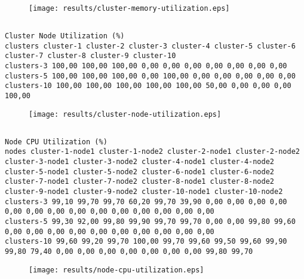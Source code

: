 \documentclass{elsart}
\begin{document}
\begin{figure}[ht]
\centering
\texttt{[image: results/cluster-memory-utilization.eps]}
\caption{}\label{fig:cluster-memory-utilization.eps}
\end{figure}

\subsection{}

\begin{lstlisting}[caption={}]
Cluster Node Utilization (%)
clusters cluster-1 cluster-2 cluster-3 cluster-4 cluster-5 cluster-6 cluster-7 cluster-8 cluster-9 cluster-10
clusters-3 100,00 100,00 100,00 0,00 0,00 0,00 0,00 0,00 0,00 0,00
clusters-5 100,00 100,00 100,00 0,00 100,00 0,00 0,00 0,00 0,00 0,00
clusters-10 100,00 100,00 100,00 100,00 100,00 50,00 0,00 0,00 0,00 100,00
\end{lstlisting}

\begin{figure}[ht]
\centering
\texttt{[image: results/cluster-node-utilization.eps]}
\caption{}\label{fig:cluster-node-utilization.eps}
\end{figure}

\subsection{}

\begin{lstlisting}[caption={}]
Node CPU Utilization (%)
nodes cluster-1-node1 cluster-1-node2 cluster-2-node1 cluster-2-node2 cluster-3-node1 cluster-3-node2 cluster-4-node1 cluster-4-node2 cluster-5-node1 cluster-5-node2 cluster-6-node1 cluster-6-node2 cluster-7-node1 cluster-7-node2 cluster-8-node1 cluster-8-node2 cluster-9-node1 cluster-9-node2 cluster-10-node1 cluster-10-node2
clusters-3 99,10 99,70 99,70 60,20 99,70 39,90 0,00 0,00 0,00 0,00 0,00 0,00 0,00 0,00 0,00 0,00 0,00 0,00 0,00 0,00
clusters-5 99,30 92,00 99,80 99,90 99,70 99,70 0,00 0,00 99,80 99,60 0,00 0,00 0,00 0,00 0,00 0,00 0,00 0,00 0,00 0,00
clusters-10 99,60 99,20 99,70 100,00 99,70 99,60 99,50 99,60 99,90 99,80 79,40 0,00 0,00 0,00 0,00 0,00 0,00 0,00 99,80 99,70
\end{lstlisting}

\begin{figure}[ht]
\centering
\texttt{[image: results/node-cpu-utilization.eps]}
\caption{}\label{fig:node-cpu-utilization.eps}
\end{figure}
\end{document}
